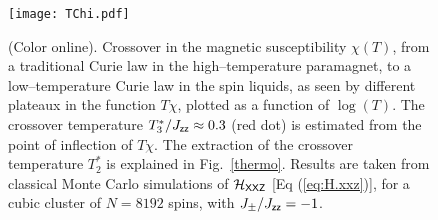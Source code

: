 \documentclass[apsrev4-1,prx,superscriptaddress,floatfix,twocolumn,longbibliography]{revtex4-1}
\begin{document}
\begin{appendix}
\begin{figure}[b]
  \texttt{[image: TChi.pdf]}
  \caption{(Color online).
  Crossover in the magnetic susceptibility $\chi(T)$, 
  from a traditional Curie law in the high--temperature paramagnet, 
  to a low--temperature Curie law in the spin liquids, as seen by different plateaux 
  in the function $T\chi$, plotted as a function of $\log (T)$.
 The crossover temperature $T_{3}^{\ast}/J_{\sf zz} \approx 0.3$ (red dot) is estimated 
 from the point of inflection of $T\chi$. 
 The extraction of the crossover temperature $T_{2}^{\ast}$ is explained in Fig.~\ref{thermo}.
 Results are taken from classical Monte Carlo simulations of $\mathcal{H}_{\sf XXZ}$ 
 [Eq (\ref{eq:H.xxz})], for a cubic cluster of $N=8192$ spins, with
 $J_{\pm}/J_{\sf zz} = -1$.}
  \label{fig:T.CLC}
\end{figure}



\end{appendix}
\end{document}
